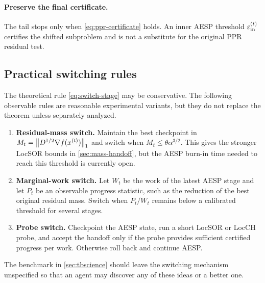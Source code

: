 \paragraph{Preserve the final certificate.}
The tail stops only when \cref{eq:ppr-certificate} holds.  An inner AESP
threshold \(\varepsilon_{\mathrm{in}}^{(t)}\) certifies the shifted subproblem and
is not a substitute for the original PPR residual test.

\subsection{Practical switching rules}

The theoretical rule \cref{eq:switch-stage} may be conservative.  The
following observable rules are reasonable experimental variants, but they do
not replace the theorem unless separately analyzed.

\begin{enumerate}[leftmargin=2em]
\item \textbf{Residual-mass switch.}  Maintain the best checkpoint in
\(
M_t=\left\lVert D^{1/2}\nabla f(x^{(t)})\right\rVert_1
\)
and switch when \(M_t\leq\theta\alpha^{3/2}\).  This gives the stronger
LocSOR bounds in \cref{sec:mass-handoff}, but the AESP burn-in time needed to
reach this threshold is currently open.

\item \textbf{Marginal-work switch.}  Let \(W_t\) be the work of the latest
AESP stage and let \(P_t\) be an observable progress statistic, such as the
reduction of the best original residual mass.  Switch when \(P_t/W_t\) remains
below a calibrated threshold for several stages.

\item \textbf{Probe switch.}  Checkpoint the AESP state, run a short LocSOR or
LocCH probe, and accept the handoff only if the probe provides sufficient
certified progress per work.  Otherwise roll back and continue AESP.
\end{enumerate}

The benchmark in \cref{sec:tbscience} should leave the switching mechanism
unspecified so that an agent may discover any of these ideas or a better one.
